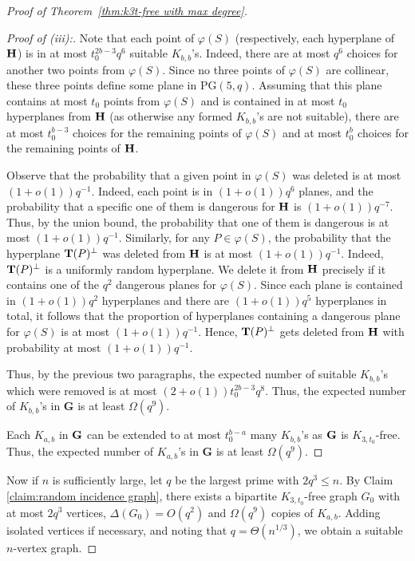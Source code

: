 \documentclass[12pt]{article}
\begin{document}
\begin{proof}[Proof of Theorem~\ref{thm:k3t-free with max degree}]
\begin{proof}[Proof of (iii):]
Note that each point of $\varphi(S)$ (respectively, each hyperplane of $\bold{H}$) is in at most $t_0^{2b - 3}q^6$ suitable $K_{b, b}$'s. Indeed, there are at most $q^6$ choices for another two points from $\varphi(S)$. Since no three points of $\varphi(S)$ are collinear, these three points define some plane in $\textrm{PG}(5, q)$. Assuming that this plane contains at most $t_0$ points from $\varphi(S)$ and is contained in at most $t_0$ hyperplanes from $\bold{H}$ (as otherwise any formed $K_{b, b}$'s are not suitable), there are at most $t_0^{ b - 3}$ choices for the remaining points of $\varphi(S)$ and at most $t_0^b$ choices for the remaining points of $\bold{H}$.

Observe that the probability that a given point in $\varphi(S)$ was deleted is at most $(1+o(1))q^{-1}$. Indeed, each point is in $(1 + o(1))q^{6}$ planes, and the probability that a specific one of them is dangerous for $\bold{H}$ is $(1 + o(1))q^{-7}$. Thus, by the union bound, the probability that one of them is dangerous is at most $(1+o(1))q^{-1}$.
Similarly, for any $P\in \varphi(S)$, the probability that the hyperplane $\bold{T}(P)^{\perp}$ was deleted from $\bold{H}$ is at most $(1+o(1))q^{-1}$. Indeed, $\bold{T}(P)^{\perp}$ is a uniformly random hyperplane. We delete it from $\bold{H}$ precisely if it contains one of the $q^2$ dangerous planes for $\varphi(S)$. Since each plane is contained in $(1+o(1))q^2$ hyperplanes and there are $(1+o(1))q^5$ hyperplanes in total, it follows that the proportion of hyperplanes containing a dangerous plane for $\varphi(S)$ is at most $(1+o(1))q^{-1}$. Hence, $\bold{T}(P)^{\perp}$ gets deleted from $\bold{H}$ with probability at most $(1+o(1))q^{-1}$.

Thus, by the previous two paragraphs, the expected number of suitable $K_{b, b}$'s which were removed is at most $(2 + o(1))t_0^{2b - 3}q^8$. Thus, the expected number of $K_{b, b}$'s in $\textbf{G}$ is at least $\Omega(q^9)$. 

 Each $K_{a, b}$ in $\bold{G}$ can be extended to at most $t_0^{b - a}$ many $K_{b, b}$'s as $\bold{G}$ is $K_{3, t_0}$-free. Thus, the expected number of $K_{a, b}$'s in $\textbf{G}$ is at least $\Omega(q^9)$.
\end{proof}

Now if $n$ is sufficiently large, let $q$ be the largest prime with $2q^3\leq n$. By Claim \ref{claim:random incidence graph}, there exists a bipartite $K_{3,t_0}$-free graph $G_0$ with at most $2q^3$ vertices, $\Delta(G_0)=O(q^2)$ and $\Omega(q^9)$ copies of $K_{a,b}$. Adding isolated vertices if necessary, and noting that $q=\Theta(n^{1/3})$, we obtain a suitable $n$-vertex graph.
\end{proof}
\end{document}
